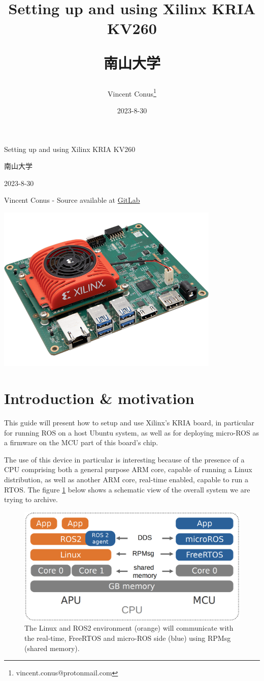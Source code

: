 \documentclass[10pt]{article}
\author{Vincent Conus\thanks{vincent.conus@protonmail.com}}
\date{2023-8-30}
\title{Setting up and using Xilinx KRIA KV260\\\medskip
\large \begin{CJK}{UTF8}{min}南山大学\end{CJK}}
\newcommand{\gitlab}[1]{%
\href{#1}{GitLab \faGitlab}}
\begin{document}
\begin{titlepage}
\centering
{\LARGE Setting up and using Xilinx KRIA KV260 \par }
\vspace{5mm}
{\large \begin{CJK}{UTF8}{min}南山大学\end{CJK} \par}
\vspace{1cm}
{\large 2023-8-30 \par}
\vspace{2cm}
{\large Vincent Conus -  Source available at \gitlab{https://gitlab.com/sunoc/xilinx-kria-kv260-documentation} \par}
\vspace{3cm}
\includegraphics[width=0.8\textwidth]{./img/board}\end{titlepage}
\tableofcontents
\pagebreak
\section{Introduction \& motivation}
\label{sec:org960306d}
This guide will present how to setup and use Xilinx's KRIA board, in particular
for running ROS on a host Ubuntu system, as well as for deploying
micro-ROS as a firmware on the MCU part of this board's chip.

The use of this device in particular is interesting because of the presence
of a CPU comprising both a general purpose ARM core, capable of running
a Linux distribution, as well as another ARM core, real-time enabled,
capable to run a RTOS. The figure \ref{fig:org82f5c1f} below shows a schematic
view of the overall system we are trying to archive.

\begin{figure}[htbp]
\centering
\includegraphics[width=.6\textwidth]{./img/map.png}
\caption{\label{fig:org82f5c1f}The Linux and ROS2 environment (orange) will communicate with the real-time, FreeRTOS and micro-ROS side (blue) using RPMsg (shared memory).}
\end{figure}
\end{document}
